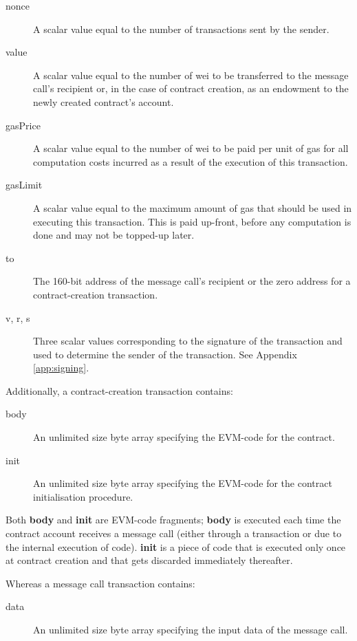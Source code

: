 \documentclass[9pt,oneside]{amsart}
\begin{document}
\begin{multicols}{2}
\begin{description}
\item[nonce] A scalar value equal to the number of transactions sent by the sender.
\item[value] A scalar value equal to the number of wei to be transferred to the message call's recipient or, in the case of contract creation, as an endowment to the newly created contract's account.
\item[gasPrice] A scalar value equal to the number of wei to be paid per unit of gas for all computation costs incurred as a result of the execution of this transaction.
\item[gasLimit] A scalar value equal to the maximum amount of gas that should be used in executing this transaction. This is paid up-front, before any computation is done and may not be topped-up later.
\item[to] The 160-bit address of the message call's recipient or the zero address for a contract-creation transaction.
\item[v, r, s] Three scalar values corresponding to the signature of the transaction and used to determine the sender of the transaction. See Appendix \ref{app:signing}.
\end{description}

Additionally, a contract-creation transaction contains:

\begin{description}
\item[body] An unlimited size byte array specifying the EVM-code for the contract.
\item[init] An unlimited size byte array specifying the EVM-code for the contract initialisation procedure.
\end{description}

Both \textbf{body} and \textbf{init} are EVM-code fragments; \textbf{body} is executed each time the contract account receives a message call (either through a transaction or due to the internal execution of code). \textbf{init} is a piece of code that is executed only once at contract creation and that gets discarded immediately thereafter.

Whereas a message call transaction contains:

\begin{description}
\item[data] An unlimited size byte array specifying the input data of the message call.
\end{description}



\end{multicols}
\end{document}

